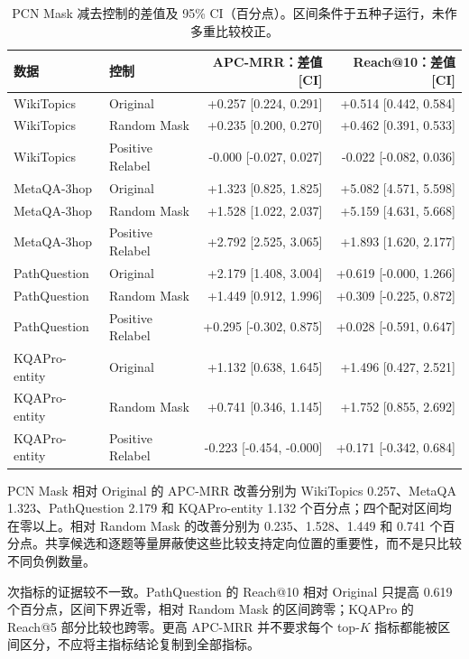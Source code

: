 \documentclass[UTF8,a4paper,10pt,fontset=fandol]{ctexart}
\begin{document}
\begin{table}[tbp]\centering
\caption{PCN Mask 减去控制的差值及 95\% CI（百分点）。区间条件于五种子运行，未作多重比较校正。}\label{tab:delta}
\small
\begin{tabular}{llrr}
\toprule
数据 & 控制 & APC-MRR：差值 [CI] & Reach@10：差值 [CI] \\
\midrule
WikiTopics & Original & +0.257 [0.224, 0.291] & +0.514 [0.442, 0.584] \\
WikiTopics & Random Mask & +0.235 [0.200, 0.270] & +0.462 [0.391, 0.533] \\
WikiTopics & Positive Relabel & -0.000 [-0.027, 0.027] & -0.022 [-0.082, 0.036] \\
MetaQA-3hop & Original & +1.323 [0.825, 1.825] & +5.082 [4.571, 5.598] \\
MetaQA-3hop & Random Mask & +1.528 [1.022, 2.037] & +5.159 [4.631, 5.668] \\
MetaQA-3hop & Positive Relabel & +2.792 [2.525, 3.065] & +1.893 [1.620, 2.177] \\
PathQuestion & Original & +2.179 [1.408, 3.004] & +0.619 [-0.000, 1.266] \\
PathQuestion & Random Mask & +1.449 [0.912, 1.996] & +0.309 [-0.225, 0.872] \\
PathQuestion & Positive Relabel & +0.295 [-0.302, 0.875] & +0.028 [-0.591, 0.647] \\
KQAPro-entity & Original & +1.132 [0.638, 1.645] & +1.496 [0.427, 2.521] \\
KQAPro-entity & Random Mask & +0.741 [0.346, 1.145] & +1.752 [0.855, 2.692] \\
KQAPro-entity & Positive Relabel & -0.223 [-0.454, -0.000] & +0.171 [-0.342, 0.684] \\
\bottomrule
\end{tabular}
\end{table}

PCN Mask 相对 Original 的 APC-MRR 改善分别为 WikiTopics 0.257、MetaQA 1.323、PathQuestion 2.179 和 KQAPro-entity 1.132 个百分点；四个配对区间均在零以上。相对 Random Mask 的改善分别为 0.235、1.528、1.449 和 0.741 个百分点。共享候选和逐题等量屏蔽使这些比较支持定向位置的重要性，而不是只比较不同负例数量。

次指标的证据较不一致。PathQuestion 的 Reach@10 相对 Original 只提高 0.619 个百分点，区间下界近零，相对 Random Mask 的区间跨零；KQAPro 的 Reach@5 部分比较也跨零。更高 APC-MRR 并不要求每个 top-$K$ 指标都能被区间区分，不应将主指标结论复制到全部指标。
\end{document}

